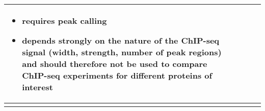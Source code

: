 \begin{landscape}
\begin{singlespacing}
\begin{small}
\begin{longtable}{>{\textsf\bgroup\raggedleft\arraybackslash}p{2cm}<{\egroup} >{\textsf\bgroup}p{6.5cm}<{\egroup} >{\textsf\bgroup}p{6.1cm}<{\egroup}>{\textsf\bgroup}p{6.7cm}<{\egroup}}
\begin{minipage}{6.7cm}
\begin{itemize}[noitemsep,leftmargin=*]
						\item requires peak calling
						\item depends strongly on the nature of the ChIP-seq signal (width, strength, number of peak regions) and should therefore not be used to compare ChIP-seq experiments for different proteins of interest \citep{Landt2012}
\vskip 6pt
					\end{itemize}
			\end{minipage}
\tabularnewline \bottomrule
\label{tab:qscores}
\end{longtable}
\end{small}
\end{singlespacing}
\end{landscape}


